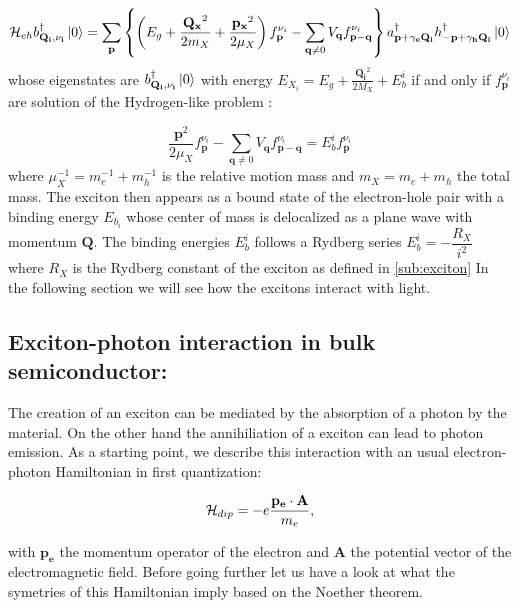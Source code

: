 \begin{equation}
    \begin{align}
    \mathcal{H}_{eh}b^{\dagger}_{\mathbf{Q_i,\nu_i}}\ket{0} = \sum_{\mathbf{p}}  \left\{\left(E_g + \dfrac{\mathbf{Q_x}^2}{2m_X} + \dfrac{\mathbf{p_x}^2}{2\mu_X} \right)f_{\mathbf{p}}^{\nu_i} - \sum_{\mathbf{q}\neq 0} V_\mathbf{q}f_{\mathbf{p-q}}^{\nu_i}\right\}a^{\dagger}_{\mathbf{p+\gamma_e\mathbf{Q_i}}}h^{\dagger}_{\mathbf{-p+\gamma_h\mathbf{Q_i}}}\ket{0}
    \end{align}
\end{equation}
whose eigenstates are $b^{\dagger}_{\mathbf{Q_i,\nu_i}}\ket{0}$ with energy $E_{X_i} = E_g + \frac{\mathbf{Q_i}^2}{2M_X} + E_{b}^i$ if and only if $f_{\mathbf{p}}^{\nu_i}$ are solution of the Hydrogen-like problem : 

\begin{equation}
    \dfrac{\mathbf{p}^2}{2\mu_X}f_{\mathbf{p}}^{\nu_i} -\sum_{\mathbf{q}\neq 0} V_\mathbf{q}f_{\mathbf{p-q}}^{\nu_i} = E_b^if_{\mathbf{p}}^{\nu_i}
    \label{eq:hydrogen_like_problem}
\end{equation}
 where $\mu_X^{-1}= m_e^{-1}+m_h^{-1}$ is the relative motion mass and $m_X = m_e+m_h$ the total mass. The exciton then appears as a bound state of the electron-hole pair with a binding energy $E_{b_i}$ whose center of mass 
 is delocalized as a plane wave with momentum $\mathbf{Q}$. The binding energies $E_b^i$ follows a Rydberg series $E_b^i = -\dfrac{R_X}{i^2} $ where $R_X$ is the Rydberg constant of the exciton as defined in \autoref{sub:exciton}
In the following section we will see how the excitons interact with light.

 \subsection{Exciton-photon interaction in bulk semiconductor:} 
 \label{sub:exciton_photon_interaction}
The creation of an exciton can be mediated by the absorption of a photon by the material. On the other hand the annihiliation of a exciton can lead to photon emission.
As a starting point, we describe this interaction with an usual electron-photon Hamiltonian in first quantization:


\begin{equation}
    \mathcal{H}_{dip} = -e \dfrac{\mathbf{p_e} \cdot \mathbf{A}}{m_e},
\end{equation}

with $\mathbf{p_e}$ the momentum operator of the electron and $\mathbf{A}$ the potential vector of the electromagnetic field. Before going further let us have a look at what the symetries of this Hamiltonian imply based on the Noether theorem.

